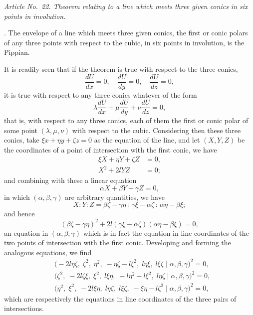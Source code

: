 \documentclass[11pt]{article}
\begin{document}
\medskip

\textit{Article No.~22. Theorem relating to a line which meets three given conics in six points in involution.}

\medskip

. The envelope of a line which meets three given conics, the first or conic polars of any three points with respect to the cubic, in six points in involution, is the Pippian.

It is readily seen that if the theorem is true with respect to the three conics,
\[
\frac{dU}{dx} = 0,\quad \frac{dU}{dy} = 0,\quad \frac{dU}{dz} = 0,
\]
it is true with respect to any three conics whatever of the form
\[
\lambda\frac{dU}{dx} + \mu\frac{dU}{dy} + \nu\frac{dU}{dz} = 0,
\]
that is, with respect to any three conics, each of them the first or conic polar of some point $(\lambda, \mu, \nu)$ with respect to the cubic. Considering then these three conics, take $\xi x + \eta y + \zeta z = 0$ as the equation of the line, and let $(X, Y, Z)$ be the coordinates of a point of intersection with the first conic, we have
\begin{align*}
\xi X + \eta Y + \zeta Z &= 0, \\
X^2 + 2 l Y Z &= 0;
\end{align*}
and combining with these a linear equation
\[
\alpha X + \beta Y + \gamma Z = 0,
\]
in which $(\alpha, \beta, \gamma)$ are arbitrary quantities, we have
\[
X : Y : Z = \beta\zeta - \gamma\eta \,:\, \gamma\xi - \alpha\zeta \,:\, \alpha\eta - \beta\xi;
\]
and hence
\[
(\beta\zeta - \gamma\eta)^2 + 2 l (\gamma\xi - \alpha\zeta)(\alpha\eta - \beta\xi) = 0,
\]
an equation in $(\alpha, \beta, \gamma)$ which is in fact the equation in line coordinates of the two points of intersection with the first conic. Developing and forming the analogous equations, we find
\begin{align*}
&\bigl(-2 l \eta\zeta,\; \zeta^2,\; \eta^2,\; -\eta\zeta - l\xi^2,\; l\eta\xi,\; l\xi\zeta \mid \alpha, \beta, \gamma\bigr)^2 = 0, \\
&\bigl(\zeta^2,\; -2 l \zeta\xi,\; \xi^2,\; l\xi\eta,\; -l\eta^2 - l\xi^2,\; l\eta\zeta \mid \alpha, \beta, \gamma\bigr)^2 = 0, \\
&\bigl(\eta^2,\; \xi^2,\; -2 l\xi\eta,\; l\eta\zeta,\; l\xi\zeta,\; -\xi\eta - l\zeta^2 \mid \alpha, \beta, \gamma\bigr)^2 = 0,
\end{align*}
which are respectively the equations in line coordinates of the three pairs of intersections.
\end{document}
